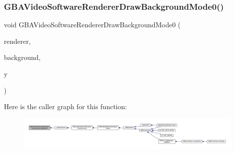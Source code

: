 \subsubsection{\texorpdfstring{G\+B\+A\+Video\+Software\+Renderer\+Draw\+Background\+Mode0()}{GBAVideoSoftwareRendererDrawBackgroundMode0()}}
{\footnotesize\ttfamily void G\+B\+A\+Video\+Software\+Renderer\+Draw\+Background\+Mode0 (\begin{DoxyParamCaption}\item[{struct G\+B\+A\+Video\+Software\+Renderer $\ast$}]{renderer,  }\item[{struct G\+B\+A\+Video\+Software\+Background $\ast$}]{background,  }\item[{\mbox{\hyperlink{ioapi_8h_a787fa3cf048117ba7123753c1e74fcd6}{int}}}]{y }\end{DoxyParamCaption})}

Here is the caller graph for this function\+:
\nopagebreak
\begin{figure}[H]
\begin{center}
\leavevmode
\includegraphics[width=350pt]{software-mode0_8c_aa2ad56e185c8e2391b4fd6bbc6835e22_icgraph}
\end{center}
\end{figure}
